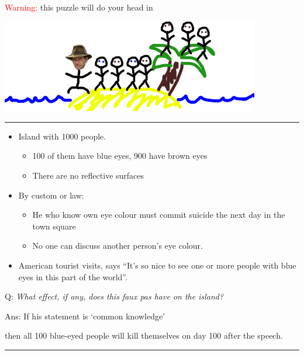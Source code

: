 \documentclass[]{article}
\providecommand{\tightlist}{%
  \setlength{\itemsep}{0pt}\setlength{\parskip}{0pt}}
\begin{document}
\textcolor{red}{Warning:} this puzzle will do your head in

\includegraphics[height=1.6in]{picsfigs/blue-eyed.png}

\begin{center}\rule{0.5\linewidth}{\linethickness}\end{center}

\begin{itemize}
\tightlist
\item
  Island with 1000 people.

  \begin{itemize}
  \tightlist
  \item
    100 of them have blue eyes, 900 have brown eyes
  \item
    There are no reflective surfaces
  \end{itemize}
\item
  By custom or law:

  \begin{itemize}
  \tightlist
  \item
    He who know own eye colour must commit suicide the next day in the town square
  \item
    No one can discuss another person's eye colour.
  \end{itemize}
\item
  American tourist visits, says ``It's so nice to see one or more people with blue eyes in this part of the world''.
\end{itemize}

\bigskip

Q: \emph{What effect, if any, does this faux pas have on the island?}

\bigskip

Ans: If his statement is `common knowledge'

then all 100 blue-eyed people will kill themselves on day 100 after the speech.

\begin{center}\rule{0.5\linewidth}{\linethickness}\end{center}
\end{document}
